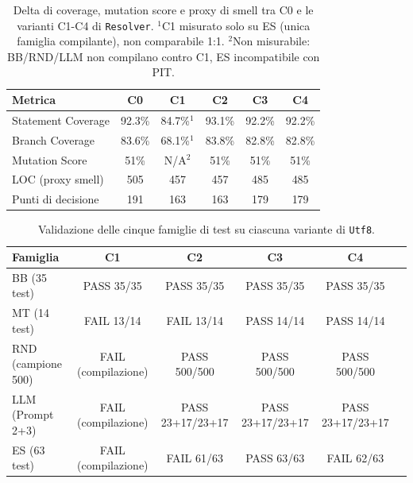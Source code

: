 \begin{table}[h]
\centering
\footnotesize
\begin{tabular}{lccccc}
\toprule
\textbf{Metrica} & \textbf{C0} & \textbf{C1} & \textbf{C2} & \textbf{C3} & \textbf{C4} \\
\midrule
Statement Coverage & 92.3\% & 84.7\%$^1$ & 93.1\% & 92.2\% & 92.2\% \\
Branch Coverage & 83.6\% & 68.1\%$^1$ & 83.8\% & 82.8\% & 82.8\% \\
Mutation Score & 51\% & N/A$^2$ & 51\% & 51\% & 51\% \\
LOC (proxy smell) & 505 & 457 & 457 & 485 & 485 \\
Punti di decisione & 191 & 163 & 163 & 179 & 179 \\
\bottomrule
\end{tabular}
\caption{Delta di coverage, mutation score e proxy di smell tra C0 e le varianti C1-C4 di \texttt{Resolver}. $^1$C1 misurato solo su ES (unica famiglia compilante), non comparabile 1:1. $^2$Non misurabile: BB/RND/LLM non compilano contro C1, ES incompatibile con PIT.}
\label{tab:resolver-refactor-delta}
\end{table}
\begin{table}[h]
\centering
\footnotesize
\begin{tabular}{lccccc}
\toprule
\textbf{Famiglia} & \textbf{C1} & \textbf{C2} & \textbf{C3} & \textbf{C4} \\
\midrule
BB (35 test) & PASS 35/35 & PASS 35/35 & PASS 35/35 & PASS 35/35 \\
MT (14 test) & FAIL 13/14 & FAIL 13/14 & PASS 14/14 & PASS 14/14 \\
RND (campione 500) & FAIL (compilazione) & PASS 500/500 & PASS 500/500 & PASS 500/500 \\
LLM (Prompt 2+3) & FAIL (compilazione) & PASS 23+17/23+17 & PASS 23+17/23+17 & PASS 23+17/23+17 \\
ES (63 test) & FAIL (compilazione) & FAIL 61/63 & PASS 63/63 & FAIL 62/63 \\
\bottomrule
\end{tabular}
\caption{Validazione delle cinque famiglie di test su ciascuna variante di \texttt{Utf8}.}
\label{tab:utf8-refactor-passfail}
\end{table}


